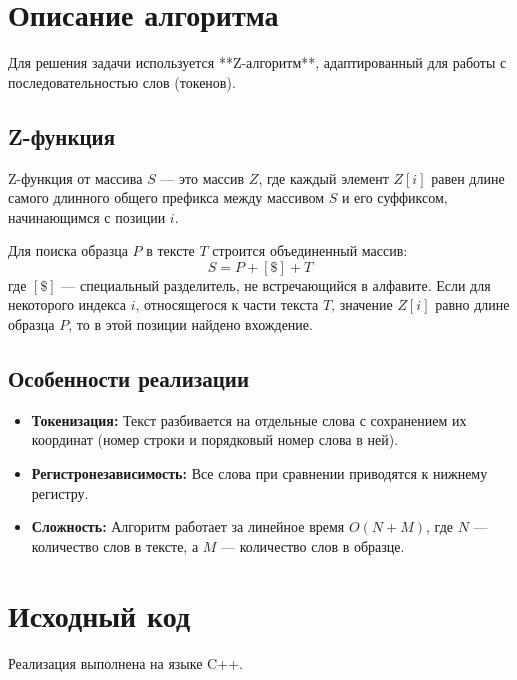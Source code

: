 \documentclass[unicode, 12pt, a4paper,oneside,fleqn]{article}
\begin{document}
\pagebreak

\section{Описание алгоритма}
Для решения задачи используется **Z-алгоритм**, адаптированный для работы с последовательностью слов (токенов). 

\subsection{Z-функция}
Z-функция от массива $S$ — это массив $Z$, где каждый элемент $Z[i]$ равен длине самого длинного общего префикса между массивом $S$ и его суффиксом, начинающимся с позиции $i$. 

Для поиска образца $P$ в тексте $T$ строится объединенный массив:
\[ S = P + [\$] + T \]
где $[\$]$ — специальный разделитель, не встречающийся в алфавите. Если для некоторого индекса $i$, относящегося к части текста $T$, значение $Z[i]$ равно длине образца $P$, то в этой позиции найдено вхождение.

\subsection{Особенности реализации}
\begin{itemize}
    \item \textbf{Токенизация:} Текст разбивается на отдельные слова с сохранением их координат (номер строки и порядковый номер слова в ней).
    \item \textbf{Регистронезависимость:} Все слова при сравнении приводятся к нижнему регистру.
    \item \textbf{Сложность:} Алгоритм работает за линейное время $O(N + M)$, где $N$ — количество слов в тексте, а $M$ — количество слов в образце.
\end{itemize}

\pagebreak

\section{Исходный код}
Реализация выполнена на языке C++.
\end{document}
